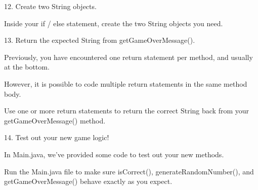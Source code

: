     12.
    Create two String objects.

    Inside your if / else statement, create the two String objects you need.

    13.
    Return the expected String from getGameOverMessage().

    Previously, you have encountered one return statement per method, and usually at the bottom.

    However, it is possible to code multiple return statements in the same method body.

    Use one or more return statements to return the correct String back from your getGameOverMessage() method.

    14.
    Test out your new game logic!

    In Main.java, we’ve provided some code to test out your new methods.

    Run the Main.java file to make sure isCorrect(), generateRandomNumber(), and getGameOverMessage() behave exactly as you expect.